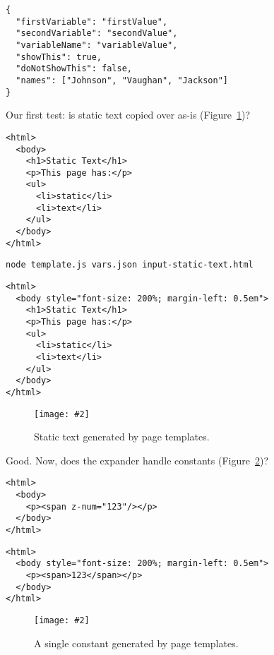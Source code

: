 \documentclass[krantzl]{krantz}
\newcommand{\figpdf}[4]{\begin{figure}%
\centering%
\texttt{[image: \#2]}%
\caption{#3}%
\label{#1}%
\end{figure}}
\newcommand{\figref}[1]{Figure~\ref{#1}}
\begin{document}
\begin{lstlisting}[frame=tblr]
{
  "firstVariable": "firstValue",
  "secondVariable": "secondValue",
  "variableName": "variableValue",
  "showThis": true,
  "doNotShowThis": false,
  "names": ["Johnson", "Vaughan", "Jackson"]
}
\end{lstlisting}



Our first test:
is static text copied over as-is (\figref{page-templates-output-static-text})?


\begin{lstlisting}[frame=tblr,backgroundcolor=\color{black!5}]
<html>
  <body>
    <h1>Static Text</h1>
    <p>This page has:</p>
    <ul>
      <li>static</li>
      <li>text</li>
    </ul>
  </body>
</html>
\end{lstlisting}



\begin{lstlisting}[frame=shadowbox]
node template.js vars.json input-static-text.html
\end{lstlisting}



\begin{lstlisting}[frame=tblr,backgroundcolor=\color{black!5}]
<html>
  <body style="font-size: 200%; margin-left: 0.5em">
    <h1>Static Text</h1>
    <p>This page has:</p>
    <ul>
      <li>static</li>
      <li>text</li>
    </ul>
  </body>
</html>
\end{lstlisting}


\figpdf{page-templates-output-static-text}{./page-templates/output-static-text.pdf}{Static text generated by page templates.}{0.6}


Good.
Now, does the expander handle constants (\figref{page-templates-output-single-constant})?


\begin{lstlisting}[frame=tblr,backgroundcolor=\color{black!5}]
<html>
  <body>
    <p><span z-num="123"/></p>
  </body>
</html>
\end{lstlisting}



\begin{lstlisting}[frame=tblr,backgroundcolor=\color{black!5}]
<html>
  <body style="font-size: 200%; margin-left: 0.5em">
    <p><span>123</span></p>
  </body>
</html>
\end{lstlisting}


\figpdf{page-templates-output-single-constant}{./page-templates/output-single-constant.pdf}{A single constant generated by page templates.}{0.6}
\end{document}
